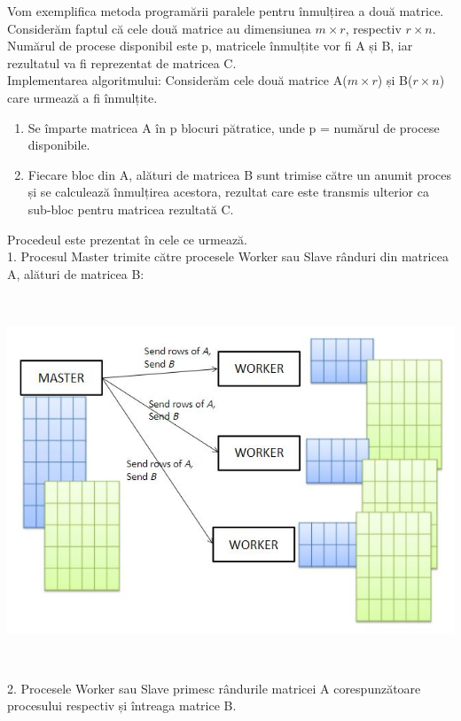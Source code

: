 \documentclass[a4paper,12pt]{report}
\newcommand\tab[1][1cm]{\hspace*{#1}}
\begin{document}
\tab Vom exemplifica metoda programării paralele pentru înmulțirea a două matrice. Considerăm faptul că cele două matrice au dimensiunea $m\times r$, respectiv $r\times n$. Numărul de procese disponibil este p, matricele înmulțite vor fi A și B, iar rezultatul va fi reprezentat de matricea C. 
\\ 
\tab Implementarea algoritmului: Considerăm cele două matrice A($m\times r$) și B($r\times n$)  care urmează a fi înmulțite.
\begin{enumerate}
  \item Se împarte matricea A în p blocuri pătratice, unde p = numărul de procese disponibile.
  \item Fiecare bloc din A, alături de matricea B sunt trimise către un anumit proces și se calculează înmulțirea acestora, rezultat care este transmis ulterior ca sub-bloc pentru matricea rezultată C.
\end{enumerate}
\tab Procedeul este prezentat în cele ce urmează.
\\ 
\tab 1. Procesul Master trimite către procesele Worker sau Slave rânduri din matricea A, alături de matricea B:
\begin{center}
	\includegraphics[width=16cm, height=11cm]{3.jpg}
\end{center}
\tab 2. Procesele Worker sau Slave primesc rândurile matricei A corespunzătoare procesului respectiv și întreaga matrice B.
\end{document}
